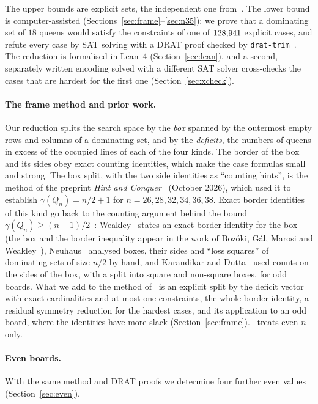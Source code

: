 \documentclass[11pt]{article}
\theoremstyle{definition}
\theoremstyle{remark}
\begin{document}
The upper bounds are explicit sets, the independent one from~\cite{OW}. The lower bound is
computer-assisted (Sections~\ref{sec:frame}--\ref{sec:n35}): we prove that a dominating set of $18$
queens would satisfy the constraints of one of $128{,}941$ explicit cases, and refute every case by
SAT solving with a DRAT proof checked by \texttt{drat-trim}~\cite{DRATtrim}. The reduction is
formalised in Lean~4 (Section~\ref{sec:lean}), and a second, separately written encoding solved with a
different SAT solver cross-checks the cases that are hardest for the first one (Section~\ref{sec:xcheck}).

\paragraph{The frame method and prior work.} Our reduction splits the search space by the \emph{box}
spanned by the outermost empty rows and columns of a dominating set, and by the \emph{deficits}, the
numbers of queens in excess of the occupied lines of each of the four kinds. The border of the box and
its sides obey exact counting identities, which make the case formulas small and strong. The box split,
with the two side identities as ``counting hints'', is the method of the preprint \emph{Hint and
Conquer}~\cite{HC} (October 2026), which used it to establish $\gamma(Q_n)=n/2+1$ for $n=26,28,32,34,36,38$.
Exact border identities of this kind go back to the counting argument behind the bound
$\gamma(Q_n)\ge(n-1)/2$~\cite{RV,Cockayne}: Weakley~\cite[proof of Theorem~1]{Weakley2022} states an
exact border identity for the box (the box and the border inequality appear in the work of Boz\'oki,
G\'al, Marosi and Weakley~\cite{BGMW}), Neuhaus~\cite[Ch.~4]{Neuhaus} analysed boxes, their sides and
``loss squares'' of dominating sets of size $n/2$ by hand, and Karandikar and Dutta~\cite{KD} used counts
on the sides of the box, with a split into square and non-square boxes, for odd boards. What we add to
the method of~\cite{HC} is an explicit split by the deficit vector with exact cardinalities and
at-most-one constraints, the whole-border identity, a residual symmetry reduction for the hardest
cases, and its application to an odd board, where the identities have more slack
(Section~\ref{sec:frame}). \cite{HC}~treats even $n$ only.

\paragraph{Even boards.} With the same method and DRAT proofs we determine four further even values
(Section~\ref{sec:even}).
\end{document}
